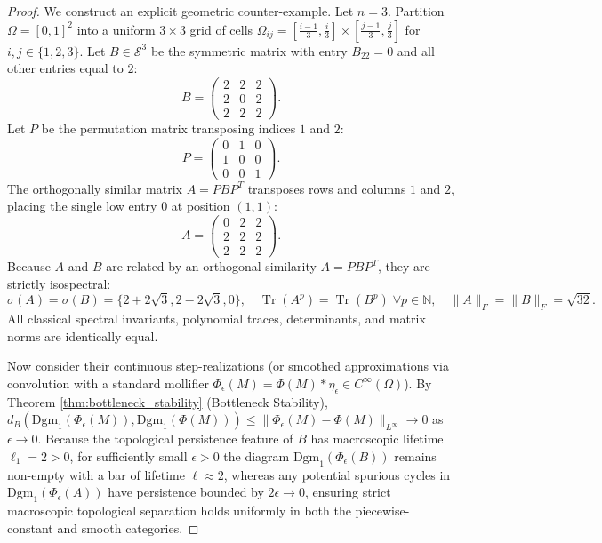\documentclass[11pt,a4paper,reqno]{amsart}
\theoremstyle{definition}
\numberwithin{equation}{section}
\newcommand{\Tr}{\operatorname{Tr}}
\begin{document}
\begin{proof}
We construct an explicit geometric counter-example. Let $n = 3$. Partition $\Omega = [0, 1]^2$ into a uniform $3 \times 3$ grid of cells $\Omega_{ij} = [\frac{i-1}{3}, \frac{i}{3}] \times [\frac{j-1}{3}, \frac{j}{3}]$ for $i, j \in \{1, 2, 3\}$.
Let $B \in \mathcal{S}^3$ be the symmetric matrix with entry $B_{22} = 0$ and all other entries equal to $2$:
\begin{equation}
    B = \begin{pmatrix} 2 & 2 & 2 \\ 2 & 0 & 2 \\ 2 & 2 & 2 \end{pmatrix}.
\end{equation}
Let $P$ be the permutation matrix transposing indices $1$ and $2$:
\begin{equation}
    P = \begin{pmatrix} 0 & 1 & 0 \\ 1 & 0 & 0 \\ 0 & 0 & 1 \end{pmatrix}.
\end{equation}
The orthogonally similar matrix $A = P B P^T$ transposes rows and columns $1$ and $2$, placing the single low entry $0$ at position $(1,1)$:
\begin{equation}
    A = \begin{pmatrix} 0 & 2 & 2 \\ 2 & 2 & 2 \\ 2 & 2 & 2 \end{pmatrix}.
\end{equation}
Because $A$ and $B$ are related by an orthogonal similarity $A = P B P^T$, they are strictly isospectral:
\begin{equation}
    \sigma(A) = \sigma(B) = \{2 + 2\sqrt{3}, 2 - 2\sqrt{3}, 0\}, \quad \Tr(A^p) = \Tr(B^p) \; \forall p \in \mathbb{N}, \quad \|A\|_F = \|B\|_F = \sqrt{32}.
\end{equation}
All classical spectral invariants, polynomial traces, determinants, and matrix norms are identically equal.

Now consider their continuous step-realizations (or smoothed approximations via convolution with a standard mollifier $\Phi_\epsilon(M) = \Phi(M) * \eta_\epsilon \in C^\infty(\Omega)$). By Theorem \ref{thm:bottleneck_stability} (Bottleneck Stability), $d_B(\mathrm{Dgm}_1(\Phi_\epsilon(M)), \mathrm{Dgm}_1(\Phi(M))) \le \|\Phi_\epsilon(M) - \Phi(M)\|_{L^\infty} \to 0$ as $\epsilon \to 0$. Because the topological persistence feature of $B$ has macroscopic lifetime $\ell_1 = 2 > 0$, for sufficiently small $\epsilon > 0$ the diagram $\mathrm{Dgm}_1(\Phi_\epsilon(B))$ remains non-empty with a bar of lifetime $\ell \approx 2$, whereas any potential spurious cycles in $\mathrm{Dgm}_1(\Phi_\epsilon(A))$ have persistence bounded by $2\epsilon \to 0$, ensuring strict macroscopic topological separation holds uniformly in both the piecewise-constant and smooth categories.


\end{proof}
\end{document}
